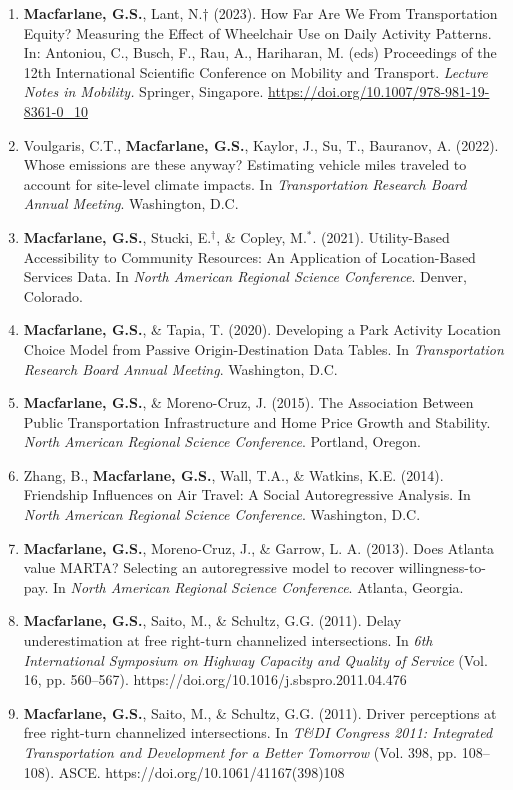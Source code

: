 \documentclass[margin,line]{res}
\newif\ifdetail{}
\newcounter{enuminitialize}
\newenvironment{myenum}[1][]
{%
 \setcounter{enuminitialize}{#1}
 \addtocounter{enuminitialize}{2}
 \begin{enumerate}[left= 4pt, itemsep=8pt, start=\value{enuminitialize}, label=\arabic*\addtocounter{enumi}{-2}]
}
{%
 \end{enumerate}
}
\begin{document}
\begin{resume}
\begin{myenum}[14]
\item \textbf{Macfarlane, G.S.}, Lant, N.$\dagger$ (2023). How Far Are We From Transportation Equity? Measuring the Effect of Wheelchair Use on Daily Activity Patterns. In: Antoniou, C., Busch, F., Rau, A., Hariharan, M. (eds) Proceedings of the 12th International Scientific Conference on Mobility and Transport. \textit{Lecture Notes in Mobility.} Springer, Singapore. \url{https://doi.org/10.1007/978-981-19-8361-0_10}

\item Voulgaris, C.T., \textbf{Macfarlane, G.S.}, Kaylor, J., Su, T., Bauranov, A. (2022). Whose emissions are these anyway? Estimating vehicle miles traveled to account for site-level climate impacts. In \textit{Transportation Research Board Annual Meeting}. Washington, D.C.
\item \textbf{Macfarlane, G.S.}, Stucki,  E.$^\dagger$,  \& Copley, M.$^*$. (2021). Utility-Based Accessibility to Community Resources: An Application of Location-Based Services Data. In \textit{North American Regional Science Conference}. Denver, Colorado.
\item \textbf{Macfarlane, G.S.}, \& Tapia, T. (2020). Developing a Park Activity Location Choice Model from Passive Origin-Destination Data Tables. In \textit{ Transportation Research Board Annual Meeting}. Washington, D.C.
\item \textbf{Macfarlane, G.S.}, \& Moreno-Cruz, J. (2015). The Association Between Public Transportation Infrastructure and Home Price Growth and Stability. \textit{North American Regional Science Conference}. Portland, Oregon.
\item Zhang, B., \textbf{Macfarlane, G.S.}, Wall, T.A., \& Watkins, K.E. (2014). Friendship Influences on Air Travel: A Social Autoregressive Analysis. In \textit{ North American Regional Science Conference}. Washington, D.C.
\item \textbf{Macfarlane, G.S.}, Moreno-Cruz, J., \& Garrow, L. A. (2013). Does Atlanta value MARTA? Selecting an autoregressive model to recover willingness-to-pay. In \textit{ North American Regional Science Conference}. Atlanta, Georgia.
\item \textbf{Macfarlane, G.S.}, Saito, M., \& Schultz, G.G. (2011). Delay underestimation at free right-turn channelized intersections. In \textit{ 6th
International Symposium on Highway Capacity and Quality of Service} (Vol. 16,
pp. 560–567). https://doi.org/10.1016/j.sbspro.2011.04.476 \ifdetail Citations:
6  \fi

\item \textbf{Macfarlane, G.S.}, Saito, M., \& Schultz, G.G. (2011). Driver
perceptions at free right-turn channelized intersections. In \textit{ T\&DI
Congress 2011: Integrated Transportation and Development for a Better Tomorrow} 
(Vol. 398, pp. 108–108). ASCE. https://doi.org/10.1061/41167(398)108 \ifdetail
Citations: 5  \fi
\end{myenum}



\end{resume}
\end{document}
